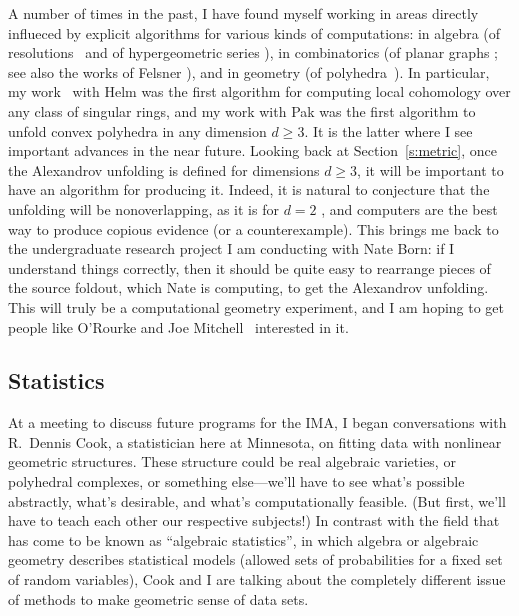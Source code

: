 \documentclass[11pt]{proposal}
\begin{document}
A number of times in the past, I have found myself working in areas
directly influeced by explicit algorithms for various kinds of
computations: in algebra (of resolutions~\cite{injAlgMEGA,AAECC} and
of hypergeometric series \cite{hornMEGA}), in combinatorics (of planar
graphs \cite{planarGraphs,AAECC}; see also the works of Felsner
\cite{felsner01,felsner03}), and in geometry (of
polyhedra~\cite{fold}).  In particular, my
work~\cite{injAlg,injAlgMEGA} with Helm was the first algorithm for
computing local cohomology over any class of singular rings, and my
work with Pak was the first algorithm to unfold convex polyhedra in
any dimension $d \geq 3$.  It is the latter where I see important
advances in the near future.  Looking back at Section~\ref{s:metric},
once the Alexandrov unfolding is defined for dimensions $d \geq 3$, it
will be important to have an algorithm for producing it.  Indeed, it
is natural to conjecture that the unfolding will be nonoverlapping, as
it is for $d=2$ \cite{AO92}, and computers are the best way to produce
copious evidence (or a counterexample).  This brings me back to the
undergraduate research project I am conducting with Nate Born: if I
understand things correctly, then it should be quite easy to rearrange
pieces of the source foldout, which Nate is computing, to get the
Alexandrov unfolding.  This will truly be a computational geometry
experiment, and I am hoping to get people like O'Rourke and Joe
Mitchell~\cite{MMP87} interested in it.

\subsection{Statistics}\label{stat}%

At a meeting to discuss future programs for the IMA, I began
conversations with R.~Dennis Cook, a statistician here at Minnesota,
on fitting data with nonlinear geometric structures.  These structure
could be real algebraic varieties, or polyhedral complexes, or
something else---we'll have to see what's possible abstractly, what's
desirable, and what's computationally feasible.  (But first, we'll
have to teach each other our respective subjects!)  In contrast with
the field that has come to be known as ``algebraic statistics'', in
which algebra or algebraic geometry describes
statistical models (allowed sets of probabilities for a fixed set of
random variables), Cook and I are talking about the completely
different issue of methods to make geometric sense of data sets.
\end{document}
